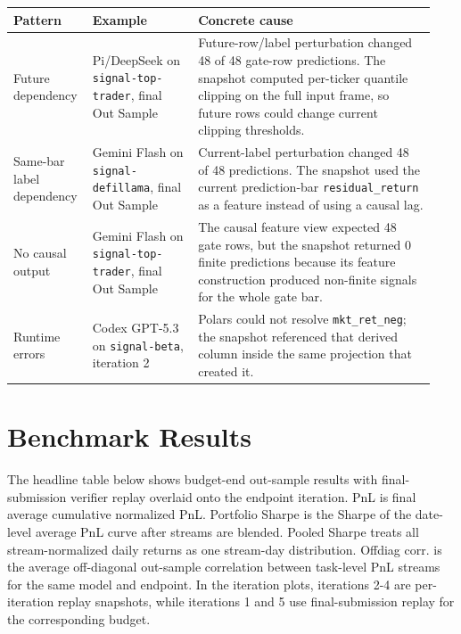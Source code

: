 \documentclass[
]{article}
\begin{document}
\begin{longtable}[]{@{}>{\raggedright\arraybackslash}p{0.16\linewidth}>{\raggedright\arraybackslash}p{0.24\linewidth}>{\raggedright\arraybackslash}p{0.54\linewidth}@{}}
\toprule\noalign{}
Pattern & Example & Concrete cause \\
\midrule\noalign{}
\endhead
\bottomrule\noalign{}
\endlastfoot
Future dependency & Pi/DeepSeek on \texttt{signal-top-trader}, final Out Sample & Future-row/label perturbation changed 48 of 48 gate-row predictions. The snapshot computed per-ticker quantile clipping on the full input frame, so future rows could change current clipping thresholds. \\
Same-bar label dependency & Gemini Flash on \texttt{signal-defillama}, final Out Sample & Current-label perturbation changed 48 of 48 predictions. The snapshot used the current prediction-bar \texttt{residual\_return} as a feature instead of using a causal lag. \\
No causal output & Gemini Flash on \texttt{signal-top-trader}, final Out Sample & The causal feature view expected 48 gate rows, but the snapshot returned 0 finite predictions because its feature construction produced non-finite signals for the whole gate bar. \\
Runtime errors & Codex GPT-5.3 on \texttt{signal-beta}, iteration 2 & Polars could not resolve \texttt{mkt\_ret\_neg}; the snapshot referenced that derived column inside the same projection that created it. \\
\end{longtable}

\FloatBarrier
\section{Benchmark Results}\label{benchmark-results}

The headline table below shows budget-end out-sample results with final-submission verifier replay overlaid onto the endpoint iteration. PnL is final average cumulative normalized PnL. Portfolio Sharpe is the Sharpe of the date-level average PnL curve after streams are blended. Pooled Sharpe treats all stream-normalized daily returns as one stream-day distribution. Offdiag corr. is the average off-diagonal out-sample correlation between task-level PnL streams for the same model and endpoint. In the iteration plots, iterations 2-4 are per-iteration replay snapshots, while iterations 1 and 5 use final-submission replay for the corresponding budget.
\end{document}
